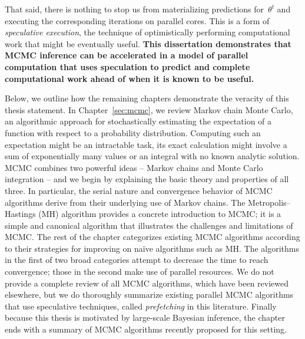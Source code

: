 \documentclass[angelino.tex]{subfiles}
\begin{document}
That said, there is nothing to stop us from materializing predictions
for~$\theta^{t}$ and executing the corresponding iterations on parallel cores.
This is a form of \emph{speculative execution}, the technique of
optimistically performing computational work that might be eventually useful.
\textbf{This dissertation demonstrates that MCMC inference can be accelerated 
in a model of parallel computation that uses speculation to predict and complete
computational work ahead of when it is known to be useful.}

Below, we outline how the remaining chapters demonstrate the veracity of
this thesis statement.
In Chapter~\ref{sec:mcmc}, we review Markov chain Monte Carlo,
an algorithmic approach for stochastically estimating the expectation of a
function with respect to a probability distribution.
Computing such an expectation might be an intractable task,
\eg its exact calculation might involve a sum of exponentially many values
or an integral with no known analytic solution.
MCMC combines two powerful ideas -- Markov chains and Monte Carlo integration --
and we begin by explaining the basic theory and properties of all three.
In particular, the serial nature and convergence behavior of MCMC algorithms
derive from their underlying use of Markov chains.
The Metropolis--Hastings (MH) algorithm provides a concrete introduction to
MCMC; it is a simple and canonical algorithm that illustrates
the challenges and limitations of MCMC.
The rest of the chapter categorizes existing MCMC algorithms according to
their strategies for improving on na\"{i}ve algorithms such as MH.
The algorithms in the first of two broad categories attempt to decrease the time
to reach convergence; those in the second make use of parallel resources.
We do not provide a complete review of all MCMC algorithms,
which have been reviewed elsewhere, but we do thoroughly summarize existing
parallel MCMC algorithms that use speculative techniques,
called \emph{prefetching} in this literature.
Finally because this thesis is motivated by large-scale Bayesian inference,
the chapter ends with a summary of MCMC algorithms
recently proposed for this setting.
\end{document}
